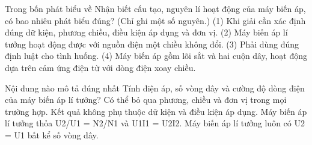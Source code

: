 \begin{ex}
Trong bốn phát biểu về Nhận biết cấu tạo, nguyên lí hoạt động của máy biến áp, có bao nhiêu phát biểu đúng? (Chỉ ghi một số nguyên.) (1) Khi giải cần xác định đúng dữ kiện, phương chiều, điều kiện áp dụng và đơn vị. (2) Máy biến áp lí tưởng hoạt động được với nguồn điện một chiều không đổi. (3) Phải dùng đúng định luật cho tình huống. (4) Máy biến áp gồm lõi sắt và hai cuộn dây, hoạt động dựa trên cảm ứng điện từ với dòng điện xoay chiều.
\end{ex}

\begin{ex}
Nội dung nào mô tả đúng nhất Tính điện áp, số vòng dây và cường độ dòng điện của máy biến áp lí tưởng?
\choice
{Có thể bỏ qua phương, chiều và đơn vị trong mọi trường hợp.}
{Kết quả không phụ thuộc dữ kiện và điều kiện áp dụng.}
{\True Máy biến áp lí tưởng thỏa U2/U1 = N2/N1 và U1I1 = U2I2.}
{Máy biến áp lí tưởng luôn có U2 = U1 bất kể số vòng dây.}
\end{ex}

